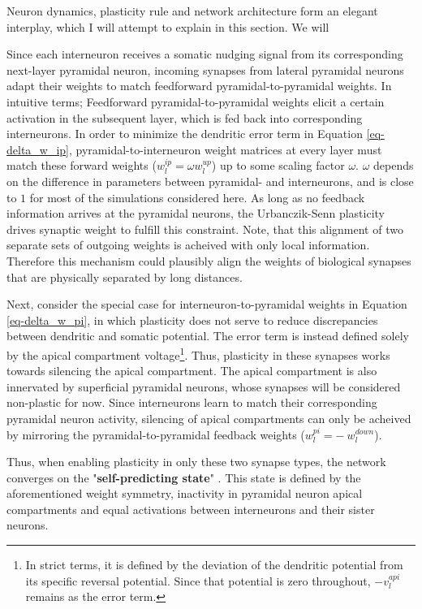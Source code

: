 Neuron dynamics, plasticity rule and network architecture form an elegant interplay, which I will attempt to \phrasing
explain in this section. We will

Since each interneuron receives a somatic nudging signal from its corresponding next-layer pyramidal neuron, incoming
synapses from lateral pyramidal neurons adapt their weights to match feedforward pyramidal-to-pyramidal weights. In
intuitive terms; Feedforward pyramidal-to-pyramidal weights elicit a certain activation in the subsequent layer, which
is fed back into corresponding interneurons. In order to minimize the dendritic error term in Equation
\ref{eq-delta_w_ip}, pyramidal-to-interneuron weight matrices at every layer must match these forward weights ($w_l^{ip}
= \omega w_l^{up}$) up to some scaling factor $\omega$. $\omega$ depends on the difference in parameters between
pyramidal- and interneurons, and is close to $1$ for most of the simulations considered here. As long as no feedback
information arrives at the pyramidal neurons, the Urbanczik-Senn plasticity drives synaptic weight to fulfill this
constraint. Note, that this alignment of two separate sets of outgoing weights is acheived with only local information.
Therefore this mechanism could plausibly align the weights of biological synapses that are physically separated by long
distances. \newline

Next, consider the special case for interneuron-to-pyramidal weights in Equation \ref{eq-delta_w_pi}, in which
plasticity does not serve to reduce discrepancies between dendritic and somatic potential. The error term is instead
defined solely by the apical compartment voltage\footnote{In strict terms, it is defined by the deviation of the
dendritic potential from its specific reversal potential. Since that potential is zero throughout, $- v_l^{api}$ remains
as the error term.}. Thus, plasticity in these synapses works towards silencing the apical compartment. The apical
compartment is also innervated by superficial pyramidal neurons, whose synapses will be considered non-plastic for now.
Since interneurons learn to match their corresponding pyramidal neuron activity, silencing of apical compartments can 
only be 
acheived by mirroring the pyramidal-to-pyramidal feedback weights ($w_l^{pi} = -\ w_l^{down}$).\newline

Thus, when enabling plasticity in only these two synapse types, the network converges on the "\textbf{self-predicting
  state}" \citep{sacramento2018dendritic}. This state is defined by the aforementioned weight symmetry, inactivity in
  pyramidal neuron apical compartments and equal activations between interneurons and their sister neurons.




